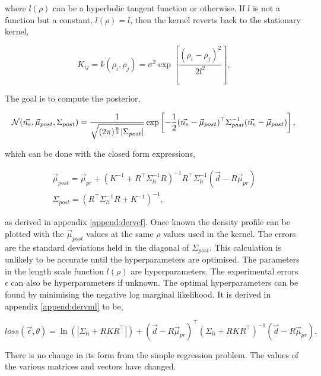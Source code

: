 \noindent where $l(\rho)$ can be a hyperbolic tangent function or otherwise. If $l$ is not a function but a constant, $l(\rho) = l$, then the kernel reverts back to the stationary kernel,

\begin{equation}
K_{ij} = k(\rho_i, \rho_j) = \sigma^2 \exp\left[{\frac{(\rho_i - \rho_j)^2}{2l^2}}\right],
\end{equation}
  
\noindent The goal is to compute the posterior,

\begin{equation}
\mathcal{N}(\vec{n_e}, \vec{\mu}_{post}, \Sigma_{post}) = \frac{1}{\sqrt{(2\pi)^{\frac{n}{2}}|\Sigma_{post}|}} \exp \left[{{-\frac{1}{2}(\vec{n_e}-\vec{\mu}_{post})^\top\Sigma_{post}^{-1}(\vec{n_e}-\vec{\mu}_{post})}}\right],\\
\end{equation}

\noindent which can be done with the closed form expressions,

\begin{gather}
    \vec{\mu}_{post}= \vec{\mu}_{pr} + (K^{-1} + R^{\top} \Sigma_{li}^{-1} R)^{-1} R^{\top} \Sigma_{li}^{-1} (\vec{d} - R \vec{\mu}_{pr})\\
    \Sigma_{post} = \left(R^\top \Sigma_{li}^{-1} R + K^{-1}\right)^{-1},
\end{gather}

\noindent as derived in appendix \ref{append:dervcf}. Once known the density profile can be plotted with the $\vec{\mu}_{post}$ values at the same $\rho$ values used in the kernel. The errors are the standard deviations held in the diagonal of $\Sigma_{post}$. This calculation is unlikely to be accurate until the hyperparameters are optimised. The parameters in the length scale function $l(\rho)$ are hyperparameters. The experimental errors $\epsilon$ can also be hyperparameters if unknown. The optimal hyperparameters can be found by minimising the negative log marginal likelihood. It is derived in appendix \ref{append:dervml} to be, 

\begin{equation}
loss(\vec \epsilon,\theta) = \ln(|\Sigma_{li}+RKR^\top|) + (\vec{d} - R\vec{\mu}_{pr})^{\top} (\Sigma_{li} + R K R^{\top})^{-1} (\vec{d} - R\vec{\mu}_{pr}).
\end{equation}

\noindent There is no change in its form from the simple regression problem. The values of the various matrices and vectors have changed. 


